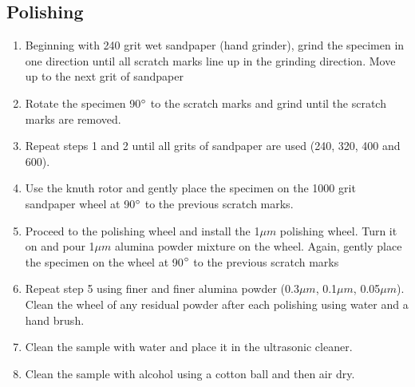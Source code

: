\documentclass[11pt]{article}
\begin{document}
\subsection{Polishing}
\begin{enumerate}
\item Beginning with 240 grit wet sandpaper (hand grinder), grind the specimen in one direction until all scratch marks line up in the grinding direction. Move up to the next grit of sandpaper

\item Rotate the specimen 90\(\degree\) to the scratch marks and grind until the scratch marks are removed.

\item Repeat steps 1 and 2 until all grits of sandpaper are used (240, 320, 400 and 600).

\item Use the knuth rotor and gently place the specimen on the 1000 grit sandpaper wheel at 90\(\degree\) to the previous scratch marks.

\item Proceed to the polishing wheel and install the 1\(\mu m\) polishing wheel. Turn it on and pour 1\(\mu m\) alumina powder mixture on the wheel. Again, gently place the specimen on the wheel at 90\(\degree\) to the previous scratch marks

\item Repeat step 5 using finer and finer alumina powder (0.3\(\mu m\), 0.1\(\mu m\), 0.05\(\mu m\)). Clean the wheel of any residual powder after each polishing using water and a hand brush.

\item Clean the sample with water and place it in the ultrasonic cleaner.

\item Clean the sample with alcohol using a cotton ball and then air dry.
\end{enumerate}
\end{document}
